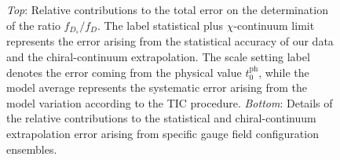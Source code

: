 \begin{figure}
\begin{center}
\begin{minipage}{.8\linewidth}
\end{minipage}
\end{center}
\vspace{-5mm}
	\caption{\textit{Top}: Relative contributions to the total error on the determination of the ratio $f_{D_s}/f_D$. The label statistical plus $\chi$-continuum limit represents the error arising from the statistical accuracy of our data and the chiral-continuum extrapolation. The scale setting label denotes the error coming from the physical value $t_0^{\mathrm{ph}}$, while the model average represents the systematic error arising from the model variation according to the TIC procedure. \textit{Bottom}: Details of the relative contributions to the statistical and chiral-continuum extrapolation error arising from specific gauge field configuration ensembles. 
          }
	    \label{fig:fds_ratio_error}
\end{figure}


